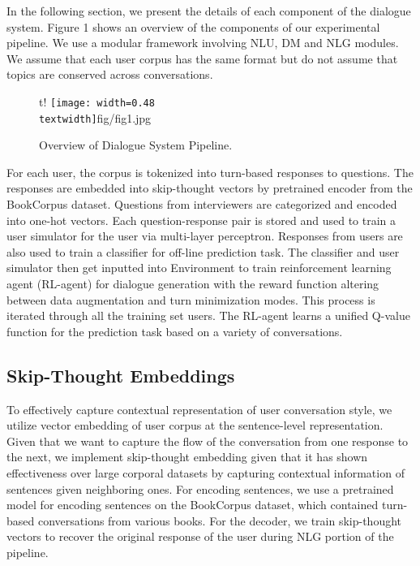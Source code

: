 
In the following section, we present the details of each component of the dialogue system. 
Figure 1 shows an overview of the components of our experimental pipeline. 
We use a modular framework involving NLU, DM and NLG modules.
We assume that each user corpus has the same format but do not assume that topics are conserved across conversations.

\begin{figure}{t!}
\centering
\texttt{[image: width=0.48\\textwidth]}{fig/fig1.jpg}
\caption{Overview of Dialogue System Pipeline.}
\label{fig:fig1}
\end{figure}

For each user, the corpus is tokenized into turn-based responses to questions. 
The responses are embedded into skip-thought vectors by pretrained encoder from the BookCorpus dataset. 
Questions from interviewers are categorized and encoded into one-hot vectors. 
Each question-response pair is stored and used to train a user simulator for the user via multi-layer perceptron. 
Responses from users are also used to train a classifier for off-line prediction task. 
The classifier and user simulator then get inputted into Environment to train reinforcement learning agent (RL-agent) 
for dialogue generation with the reward function altering between data augmentation and turn minimization modes. 
This process is iterated through all the training set users. 
The RL-agent learns a unified Q-value function for the prediction task based on a variety of conversations.


\subsection{ Skip-Thought Embeddings }
To effectively capture contextual representation of user conversation style, 
we utilize vector embedding of user corpus at the sentence-level representation. 
Given that we want to capture the flow of the conversation from one response to the next,
we implement skip-thought embedding given that it has shown effectiveness over large corporal 
datasets by capturing contextual information of sentences given neighboring ones. 
For encoding sentences, we use a pretrained model for encoding sentences on the BookCorpus dataset, 
which contained turn-based conversations from various books. 
For the decoder, we train skip-thought vectors to recover the original response of the user during NLG portion of the pipeline.


